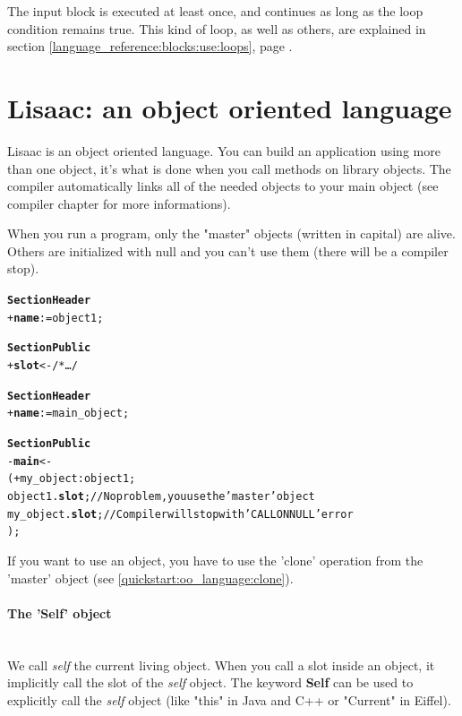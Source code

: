 \documentclass[11pt]{mybook}
\begin{document}
The input block is executed at least once, and continues as long as the
loop condition remains true. 
This kind of loop, as well as others, are explained in section
\ref{language_reference:blocks:use:loops}, page \pageref{language_reference:blocks:use:loops}.

\section{Lisaac: an object oriented language}
\label{quickstart:oo_language}
%
Lisaac is an object oriented language.
You can build an application using more than one object, it's what is done when you call methods on library objects.
The compiler automatically links all of the needed objects to your main object (see compiler chapter for more informations).

When you run a program, only the "master" objects (written in capital) are alive. Others are initialized with {\sc{}null} and you can't use them (there will be a compiler stop).

\begin{alltt} 
{\bf{}Section Header}
  + {\bf{}name}     := {\sc{}object1};          

{\bf{}Section Public}
   + {\bf{}slot} <- /* \ldots */
\end{alltt}

\begin{alltt} 
{\bf{}Section Header}
  + {\bf{}name}     := {\sc{}main\_object};          

{\bf{}Section Public}
  - {\bf{}main} <-
  ( + my\_object:{\sc{}object1};
    {\sc{}object1}.{\bf{}slot};      // No problem, you use the 'master' object
    my\_object.{\bf{}slot};           // Compiler will stop with 'CALL ON NULL' error
  );
\end{alltt}

If you want to use an object, you have to use the 'clone' operation from the 'master' object (see \ref{quickstart:oo_language:clone}).

\paragraph{The 'Self' object} 
~\\
We call {\it{}self} the current living object.
When you call a slot inside an object, it implicitly call the slot of the {\it{}self} object.
The keyword {\bf{}Self} can be used to explicitly call the {\it{}self} object (like "this" in Java and C++ or "Current" in Eiffel).
\end{document}
